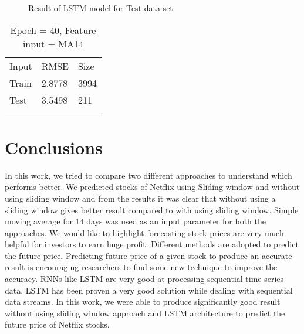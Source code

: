 \documentclass[5p,,preprint,12pt,twocolumn]{elsarticle}
\makeatletter
\def\tblbottomrule{\noalign{\vspace*{6pt}}\hline\noalign{\vspace*{2pt}}}
\def\tblmidrule{\noalign{\vspace*{6pt}}\hline\noalign{\vspace*{2pt}}}
\def\fixFloatSize#1{}%
\makeatother
\begin{document}
\bgroup
\fixFloatSize{images/aca87a5a-3f19-4cf7-9668-18f938b4bedf-u95-5-ma14-nflx-40-e-test-withou-sliding-window.png}
\begin{figure}[!htbp]
\centering \makeatletter{}
\makeatother 
\caption{{Result of LSTM model for Test data set}}
\label{f-396ecc875a55}
\end{figure}
\egroup

\begin{table}[!htbp]
\caption{{Epoch = 40, Feature input = MA14} }
\label{tw-03cba5150d1b}
\def\arraystretch{1}
\ignorespaces 
\centering 
\begin{tabulary}{\linewidth}{LLL}
\hline 
Input & RMSE & Size\\
\tblmidrule 
Train &
  2.8778 &
  3994\\
Test &
  3.5498 &
  211\\
\tblbottomrule 
\end{tabulary}\par 
\end{table}

    
\section{Conclusions}
In this work, we tried to compare two different approaches to understand which performs better. We predicted stocks of Netflix using Sliding window and without using sliding window and from the results it was clear that without using a sliding window gives better result compared to with using sliding window. Simple moving average for 14 days was used as an input parameter for both the approaches. We would like to highlight forecasting stock prices are very much helpful for investors to earn huge profit. Different methods are adopted to predict the future price. Predicting future price of a given stock to produce an accurate result is encouraging researchers to find some new technique to improve the accuracy. RNNs like LSTM are very good at processing sequential time series data. LSTM has been proven a very good solution while dealing with sequential data streams. In this work, we were able to produce significantly good result without using sliding window approach and LSTM architecture to predict the future price of Netflix stocks. 
    






\end{document}
